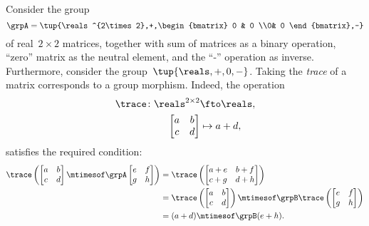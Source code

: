 \begin{example}
    Consider the group
    \begin{equation}
        \grpA=\tup{\reals^{2\times 2},+,\begin{bmatrix}
                0 & 0 \\0& 0
            \end{bmatrix},-}
    \end{equation}
    of real~$2\times 2$ matrices, together with sum of matrices as a binary operation, ``zero'' matrix as the neutral element, and the ``-'' operation as inverse.
    Furthermore, consider the group~$\tup{\reals,+,0,-}$.
    Taking the \emph{trace} of a matrix corresponds to a group morphism.
    Indeed, the operation
    \begin{equation}
        \begin{aligned}
            \trace\colon \reals^{2\times 2} & \fto \reals, \\
            \begin{bmatrix}
                a & b \\
                c & d
            \end{bmatrix}                 & \mapsto a+d,
        \end{aligned}
    \end{equation}
    satisfies the required condition:
    \begin{equation}
        \begin{aligned}
            \trace \left(
            \begin{bmatrix}
                a & b \\
                c & d
            \end{bmatrix} \mtimesof\grpA
            \begin{bmatrix}
                e & f \\
                g & h
            \end{bmatrix}
            \right) & =
            \trace
            \left(
            \begin{bmatrix}
                a+e & b+f \\
                c+g & d+h
            \end{bmatrix}
            \right) \\
                    & =\trace \left(
            \begin{bmatrix}
                a & b \\
                c & d
            \end{bmatrix}\right)\mtimesof\grpB \trace \left(
            \begin{bmatrix}
                e & f \\
                g & h
            \end{bmatrix}
            \right) \\
                    & =(a+d)\mtimesof\grpB (e+h).
        \end{aligned}
    \end{equation}
\end{example}

